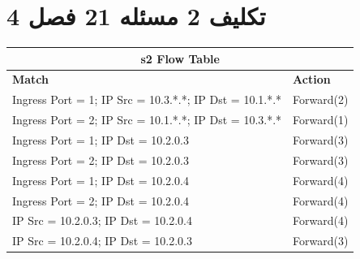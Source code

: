 \documentclass{article}
\begin{document}
\section{تکلیف 2 مسئله 21 فصل 4}
\begin{latin}
\begin{table}[H]
\begin{tabular}{|ll|}
\hline
\multicolumn{2}{|c|}{\textbf{s2 Flow Table}}                                                             \\ \hline
\multicolumn{1}{|l|}{\textbf{Match}}                                                   & \textbf{Action} \\ \hline
\multicolumn{1}{|l|}{Ingress Port = 1; IP Src = 10.3.*.*; IP Dst = 10.1.*.*}           & Forward(2)      \\ \hline
\multicolumn{1}{|l|}{Ingress Port = 2; IP Src = 10.1.*.*; IP Dst = 10.3.*.*}           & Forward(1)      \\ \hline
\multicolumn{1}{|l|}{Ingress Port = 1;                              IP Dst = 10.2.0.3} & Forward(3)      \\ \hline
\multicolumn{1}{|l|}{Ingress Port = 2;                              IP Dst = 10.2.0.3} & Forward(3)      \\ \hline
\multicolumn{1}{|l|}{Ingress Port = 1;                              IP Dst = 10.2.0.4} & Forward(4)      \\ \hline
\multicolumn{1}{|l|}{Ingress Port = 2;                              IP Dst = 10.2.0.4} & Forward(4)      \\ \hline
\multicolumn{1}{|l|}{IP Src = 10.2.0.3; IP Dst = 10.2.0.4}                             & Forward(4)      \\ \hline
\multicolumn{1}{|l|}{IP Src = 10.2.0.4; IP Dst = 10.2.0.3}                             & Forward(3)      \\ \hline
\end{tabular}
\end{table}
\end{latin}
\end{document}
